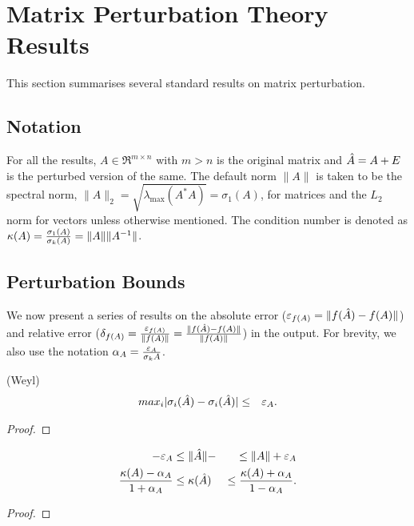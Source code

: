 \section{Matrix Perturbation Theory Results}\label{sec:perturbation-theory}

This section summarises several standard results on matrix perturbation.

\subsection{Notation}

For all the results, $A \in \Re^{m \times n}$ with $m > n$ is the
original matrix and $\hat{A} = A + E$ is the perturbed version of the same.
The default norm $\|A\|$ is taken to be the spectral norm, $\|A\|_2
= \sqrt{ \lambda_{\max}(A^*A) } = \sigma_1(A)$, for matrices and the
$L_2$ norm for vectors unless otherwise mentioned. The condition number
is denoted as $\kappa(A) = \frac{\sigma_1(A)}{\sigma_k(A)} = \|A\|
\|A^{-1}\|$.

\subsection{Perturbation Bounds}

We now present a series of results on the absolute error ($\varepsilon_{f(A)}
= \|f(\hat{A}) - f(A)\|$) and relative error ($\delta_{f(A)}
= \frac{\varepsilon_{f(A)}}{\|f(A)\|} = \frac{\|f(\hat{A}) - f(A)\|}{\|f(A)\|}$) in
the output. For brevity, we also use the notation $\alpha_{A}
= \frac{\varepsilon_{A}}{\sigma_k{A}}$.

\begin{theorem}(Weyl)
  \begin{eqnarray}
    max_i | \sigma_{i}(\hat{A}) - \sigma_{i}(\hat{A}) | &\le& \varepsilon_{A}.
  \end{eqnarray}
\end{theorem}
\begin{proof}
\end{proof}

\begin{corollary}
  \begin{align}
     - \varepsilon_{A} &\le \| \hat{A} \| -  &\le \|A\| + \varepsilon_{A} \\
    \frac{\kappa(A) - \alpha_{A}}{1 + \alpha_{A}} &\le \kappa(\hat{A}) &\le \frac{\kappa(A) + \alpha_{A}}{1 - \alpha_{A}}.
  \end{align}
\end{corollary}
\begin{proof}
\end{proof}

